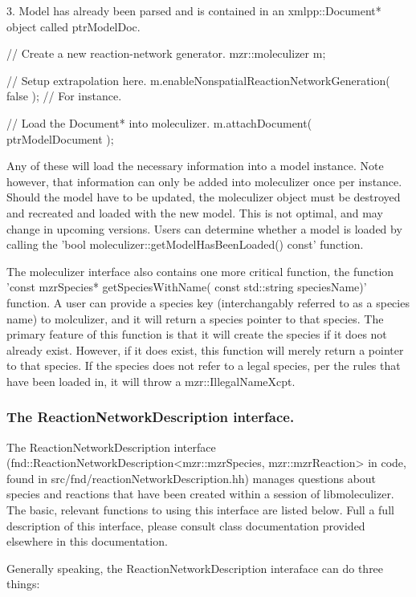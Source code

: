 3.  Model has already been parsed and is contained in an
xmlpp::Document* object called ptrModelDoc.

// Create a new reaction-network generator.
mzr::moleculizer m;

// Setup extrapolation here.
m.enableNonspatialReactionNetworkGeneration( false );  // For
instance.

// Load the Document* into moleculizer.
m.attachDocument( ptrModelDocument );

Any of these will load the necessary information into a model
instance. Note however, that information can only be added into
moleculizer once per instance.  Should the model have to be updated,
the moleculizer object must be destroyed and recreated and loaded with
the new model.  This is not optimal, and may change in upcoming
versions.  Users can determine whether a model is loaded by calling
the 'bool moleculizer::getModelHasBeenLoaded() const' function.  

The moleculizer interface also contains one more critical function,
the function 
'const mzrSpecies* getSpeciesWithName( const std::string speciesName)'
function.  A user can provide a species key (interchangably referred
to as a species name) to molculizer, and it will return a species
pointer to that species.  The primary feature of this function is that
it will create the species if it does not already exist.  However, if
it does exist, this function will merely return a pointer to that
species.  If the species does not refer to a legal species, per the
rules that have been loaded in, it will throw a mzr::IllegalNameXcpt.  

\subsubsection{The ReactionNetworkDescription interface.}
The ReactionNetworkDescription interface
(fnd::ReactionNetworkDescription<mzr::mzrSpecies, mzr::mzrReaction> in
code, found in src/fnd/reactionNetworkDescription.hh) manages questions
about species and reactions that have been created within a session of
libmoleculizer.  The basic, relevant functions to using this interface
are listed below.  Full a full description of this interface, please
consult class documentation provided elsewhere in this documentation.

Generally speaking, the ReactionNetworkDescription interaface can do
three things:

